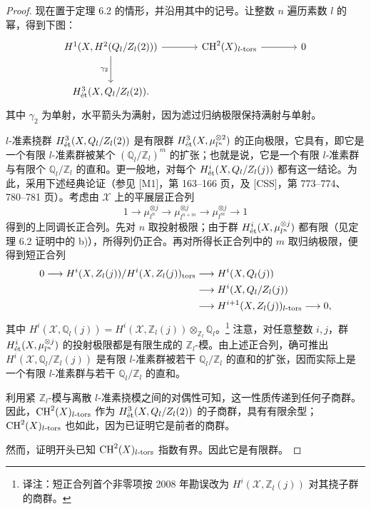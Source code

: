 \begin{proof}
现在置于定理 6.2 的情形，并沿用其中的记号。让整数 $n$ 遍历素数 $l$ 的幂，得到下图：
\[
\begin{tikzcd}[ampersand replacement=\&,column sep=large,row sep=large]
 H^1(\mathcal X,\mathcal H^2(\mathbb Q_l/\mathbb Z_l(2)))\arrow[r]\arrow[d,"{\gamma_2}"']
 \&\CH^2(\mathcal X)_{l\text{-}\tors}\arrow[r]\&0\\
 H^3_{\et}(\mathcal X,\mathbb Q_l/\mathbb Z_l(2)).
\end{tikzcd}
\]
其中 $\gamma_2$ 为单射，水平箭头为满射，因为滤过归纳极限保持满射与单射。

$l$-准素挠群 $H^3_{\mathrm{\acute et}}(X,Q_l/Z_l(2))$ 是有限群 $H^3_{\mathrm{\acute et}}(X,\mu_{l^n}^{\otimes2})$ 的正向极限，它具有，即它是一个有限 $l$-准素群被某个 $(\mathbb Q_l/\mathbb Z_l)^m$ 的扩张；也就是说，它是一个有限 $l$-准素群与有限个 $\mathbb Q_l/\mathbb Z_l$ 的直和。更一般地，对每个 $H^i_{\mathrm{\acute et}}(X,Q_l/Z_l(j))$ 都有这一结论。为此，采用下述经典论证（参见 [M1]，第 163--166 页，及 [CSS]，第 773--774、780--781 页）。考虑由 $\mathcal X$ 上的平展层正合列
\[
 1\longrightarrow\mu_{l^n}^{\otimes j}
 \longrightarrow\mu_{l^{n+m}}^{\otimes j}
 \longrightarrow\mu_{l^m}^{\otimes j}\longrightarrow1
\]
得到的上同调长正合列。先对 $n$ 取投射极限；由于群 $H^i_{\mathrm{\acute et}}(X,\mu_{l^n}^{\otimes j})$ 都有限（见定理 6.2 证明中的 b)），所得列仍正合。再对所得长正合列中的 $m$ 取归纳极限，便得到短正合列
\[
\begin{split}
 0\longrightarrow
 H^i(X,Z_l(j))/H^i(X,Z_l(j))_{\mathrm{tors}}
 &\longrightarrow H^i(X,Q_l(j))\\
 &\longrightarrow H^i(X,Q_l/Z_l(j))\\
 &\longrightarrow H^{i+1}(X,Z_l(j))_{l\text{-}\mathrm{tors}}
 \longrightarrow0,
\end{split}
\]
其中 $H^i(\mathcal X,\mathbb Q_l(j))=H^i(\mathcal X,\mathbb Z_l(j))\otimes_{\mathbb Z_l}\mathbb Q_l$。\footnote{译注：短正合列首个非零项按 2008 年勘误改为 $H^i(\mathcal X,\mathbb Z_l(j))$ 对其挠子群的商群。}
注意，对任意整数 $i,j$，群 $H^i_{\mathrm{\acute et}}(X,\mu_{l^n}^{\otimes j})$ 的投射极限都是有限生成的 $\mathbb Z_l$-模。由上述正合列，确可推出 $H^i(\mathcal X,\mathbb Q_l/\mathbb Z_l(j))$ 是有限 $l$-准素群被若干 $\mathbb Q_l/\mathbb Z_l$ 的直和的扩张，因而实际上是一个有限 $l$-准素群与若干 $\mathbb Q_l/\mathbb Z_l$ 的直和。

利用紧 $\mathbb Z_l$-模与离散 $l$-准素挠模之间的对偶性可知，这一性质传递到任何子商群。因此，$\operatorname{CH}^2(X)_{l\text{-}\mathrm{tors}}$ 作为 $H^3_{\mathrm{\acute et}}(X,Q_l/Z_l(2))$ 的子商群，具有有限余型；$\operatorname{CH}^2(X)_{l\text{-}\mathrm{tors}}$ 也如此，因为已证明它是前者的商群。

然而，证明开头已知 $\operatorname{CH}^2(X)_{l\text{-}\mathrm{tors}}$ 指数有界。因此它是有限群。
\end{proof}

